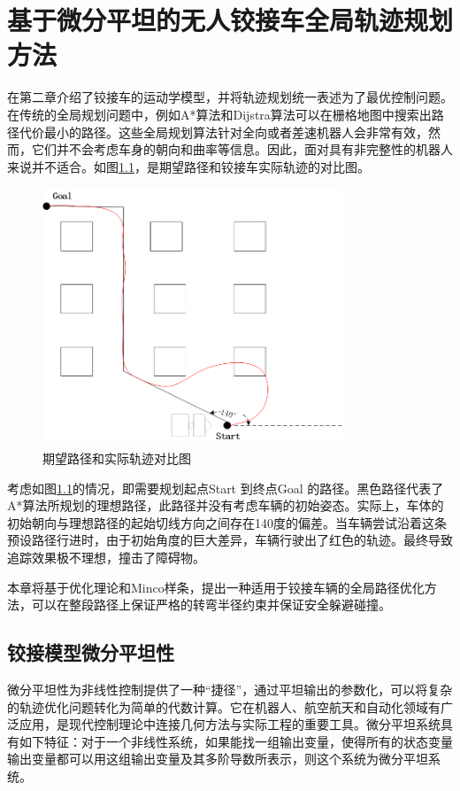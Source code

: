 \documentclass[master,academic]{ysuthesis} %
\begin{document}
	\chapter{基于微分平坦的无人铰接车全局轨迹规划方法}
		在第二章介绍了铰接车的运动学模型，并将轨迹规划统一表述为了最优控制问题。在传统的全局规划问题中，例如A*算法和Dijstra算法可以在栅格地图中搜索出路径代价最小的路径。这些全局规划算法针对全向或者差速机器人会非常有效，然而，它们并不会考虑车身的朝向和曲率等信息。因此，面对具有非完整性的机器人来说并不适合。如图\ref{fig:路径规划算法特例}，是期望路径和铰接车实际轨迹的对比图。
		\begin{figure}[H]
			\centering
			\includegraphics[width=0.8\textwidth]{路径规划算法特例.png}
			\caption{期望路径和实际轨迹对比图}
			\label{fig:路径规划算法特例}
		\end{figure}

		考虑如图\ref{fig:路径规划算法特例}的情况，即需要规划起点Start 到终点Goal 的路径。黑色路径代表了A*算法所规划的理想路径，此路径并没有考虑车辆的初始姿态。实际上，车体的初始朝向与理想路径的起始切线方向之间存在140度的偏差。当车辆尝试沿着这条预设路径行进时，由于初始角度的巨大差异，车辆行驶出了红色的轨迹。最终导致追踪效果极不理想，撞击了障碍物。
		
		本章将基于优化理论和Minco样条，提出一种适用于铰接车辆的全局路径优化方法，可以在整段路径上保证严格的转弯半径约束并保证安全躲避碰撞。
		
	\section{铰接模型微分平坦性}
		微分平坦性为非线性控制提供了一种“捷径”，通过平坦输出的参数化，可以将复杂的轨迹优化问题转化为简单的代数计算。它在机器人、航空航天和自动化领域有广泛应用，是现代控制理论中连接几何方法与实际工程的重要工具。微分平坦系统具有如下特征：对于一个非线性系统，如果能找一组输出变量，使得所有的状态变量输出变量都可以用这组输出变量及其多阶导数所表示，则这个系统为微分平坦系统。
\end{document}
